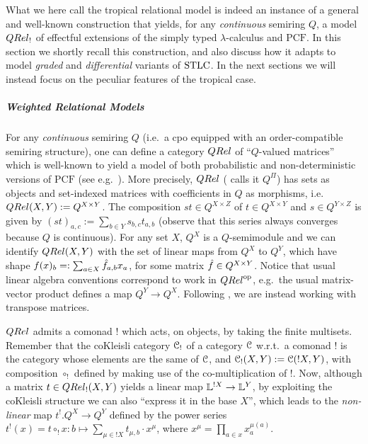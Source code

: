 
What we here call the tropical relational model is indeed an instance of a general and well-known construction that yields, for any \emph{continuous} semiring $Q$, a model $\QREL_{!}$ of effectful extensions of the simply typed $\lambda$-calculus and $\mathrm{PCF}$. In this section we shortly recall this construction, and also discuss how it adapts to model \emph{graded} and \emph{differential} variants of $\mathrm{STLC}$. In the next sections we will instead focus on the peculiar features of the tropical case.

\subparagraph*{Weighted Relational Models}
For any \emph{continuous} semiring $Q$ (i.e.~a cpo equipped with an order-compatible semiring structure), one can define a category $\QREL$ of ``$Q$-valued matrices'' which is well-known to yield a model of both probabilistic and non-deterministic versions of $\mathrm{PCF}$ (see e.g.~\cite{Manzo2013, Pagani2018}).
More precisely, $\QREL$ (\cite{Manzo2013} calls it $Q^\Pi$) has sets as objects and set-indexed matrices with coefficients in $Q$ as morphisms, i.e.~$\QREL(X,Y):=Q^{X\times Y}$.
The composition $st\in Q^{X\times Z}$ of $t\in Q^{X\times Y}$ and $s\in Q^{Y\times Z}$ is given by $(st)_{a,c}:=\sum_{b\in Y} s_{b,c}t_{a,b}$ (observe that this series always converges because $Q$ is continuous).
For any set $X$, $Q^X$ is a $Q$-semimodule and we can identify $\HOM{\QREL}{X}{Y}$ with the set of linear maps from $Q^X$ to $Q^Y$, which have shape $f(x)_b=:\sum_{a\in X} \hat{f}_{a,b}x_a$, for some matrix $\hat{f}\in Q^{X\times Y}$.
% 
Notice that usual linear algebra conventions correspond to work in $\QREL^{\op}$, %
e.g.\ the usual matrix-vector product defines a map $Q^Y\to Q^X$.
Following \cite{Manzo2013, Hofmann2014, Ehrhard2005}, we are instead working with transpose matrices.

$\QREL$ admits a comonad $!$ which acts, on objects, by taking the finite multisets.
Remember that the coKleisli category $\mathcal{C}_!$ of a category $\mathcal{C}$ w.r.t.\ a comonad $!$ is the category whose elements are the same of $\mathcal{C}$, and ${\mathcal{C}_!}(X,Y):={\mathcal{C}}(!X,Y)$, with composition $\circ_!$ defined by making use of the co-multiplication of $!$.
Now, although a matrix $t\in\HOM{\QREL_!}{X}{Y}$ yields a linear map $\mathbb{L}^{!X}\to\mathbb{L}^Y$, by exploiting the coKleisli structure we can also ``express it in the base $X$'', which leads to the \emph{non-linear} map $t^{!}.Q^{X}\to Q^{Y}$ defined by the power series
$
t^{!}(x)=t\circ_{!}x : b \mapsto \sum_{\mu\in !X}t_{\mu,b}\cdot x^{\mu}
$, 
where $x^{\mu}= \prod_{a\in x}x_{a}^{\mu(a)}$. 

